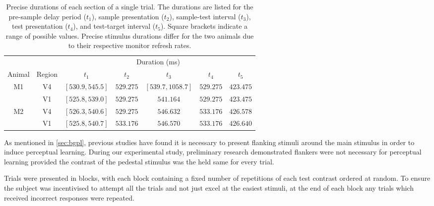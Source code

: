 \begin{table}[bthp]
{%
%
\begin{tabular}{ccccccc}
\toprule
         &          & \multicolumn{5}{c}{Duration (\si{\milli\second})} \\
\cmidrule(l){3-7}
Animal   & Region   & $t_1$            & $t_2$     & $t_3$             & $t_4$     & $t_5$     \\
\midrule
\acs{M1} & \acs{V4} & $[530.9, 545.5]$ & $529.275$ & $[539.7, 1058.7]$ & $529.275$ & $423.475$ \\
         & \acs{V1} & $[525.8, 539.0]$ & $529.275$ & $541.164$         & $529.275$ & $423.475$ \\
\acs{M2} & \acs{V4} & $[526.3, 540.6]$ & $529.275$ & $546.632$         & $533.176$ & $426.578$ \\
         & \acs{V1} & $[525.8, 540.7]$ & $533.176$ & $546.570$         & $533.176$ & $426.640$ \\
\bottomrule
%
\end{tabular}
} %
\caption{
Precise durations of each section of a single trial.
The durations are listed for the
pre-sample delay period ($t_1$),
sample presentation ($t_2$),
sample-test interval ($t_3$),
test presentation ($t_4$), and
test-target interval ($t_5$).
Square brackets indicate a range of possible values.
Precise stimulus durations differ for the two animals due to their respective monitor refresh rates.
}
\label{tab:tptimes}
\end{table}


As mentioned in \autoref{sec:bgpl}, previous studies have found it is necessary to present flanking stimuli around the main stimulus in order to induce perceptual learning.
During our experimental study, preliminary research demonstrated flankers were not necessary for perceptual learning provided the contrast of the pedestal stimulus was the held same for every trial.

Trials were presented in blocks, with each block containing a fixed number of repetitions of each test contrast ordered at random.
To ensure the subject was incentivised to attempt all the trials and not just excel at the easiest stimuli, at the end of each block any trials which received incorrect responses were repeated.


